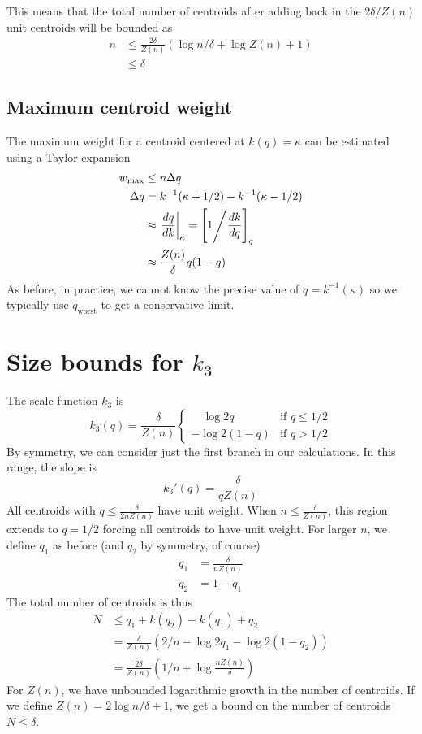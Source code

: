 \documentclass[11pt]{amsart}
\begin{document}
This means that the total number of centroids after adding back in the $2 \delta / Z(n)$ unit centroids will be bounded as
\[
\begin{aligned}
n&\le   \frac {2 \delta} {Z(n)} \left(  \log  n/ \delta + \log Z(n) + 1\right) \\
&\le  \delta
\end{aligned}
\]
\subsection{Maximum centroid weight}

The maximum weight for a centroid centered at $k(q) = \kappa$ can be estimated using a Taylor expansion
\[
\begin{aligned}
w_{\max} &\le n \Delta q \\
\Delta q &= k^{-1}(\kappa + 1/2) - k^{-1}(\kappa-1/2) \\
&\approx \left . \frac {dq} {dk} \right\rvert_{\kappa} = \left[ 1 \Bigg \slash {\frac {dk} {dq}} \right]_q\\
&\approx \frac {Z(n)} \delta q(1-q) \\
\end{aligned}
\]
As before, in practice, we cannot know the precise value of $q = k^{-1}(\kappa)$ so we typically use $q_{\text {worst}}$ to get a conservative limit.
\section{Size bounds for $k_3$}
The scale function $k_3$ is
\[
k_3(q) = \frac \delta {Z(n)}\begin{cases}
\quad \log 2q & \text{if  } q \le 1/2 \\
- \log 2(1-q) & \text{if  } q > 1/2
\end{cases}
\]
By symmetry, we can consider just the first branch in our calculations. In this range, the slope is
\[
k_3'(q) = \frac \delta { q Z(n)}  
\]
All centroids with $q \le \frac \delta {2 n Z(n)}$ have unit weight. When $n \le \frac \delta {Z(n)}$, this region extends to $q = 1/2$ forcing all centroids to have unit weight. For larger $n$, we define $q_1$ as before (and $q_2$ by symmetry, of course)
\[
\begin{aligned}
q_1 &= \frac \delta { n Z(n)} \\
q_2 &= 1-q_1
\end{aligned}
\]
The total number of centroids is thus
\[
\begin{aligned}
N &\le q_1 + k(q_2) - k(q_1) + q_2 \\
&= \frac \delta { Z(n)} \left(2/n -\log 2 q_1 - \log 2(1-q_2)\right)\\
&= \frac {2\delta} { Z(n)} \left(1/n + \log  \frac  { n Z(n)}\delta\right)
\end{aligned}
\]
For $Z(n)$, we have unbounded logarithmic growth in the number of centroids. If we define $Z(n) = 2\log n/\delta + 1$, we get a bound on the number of centroids $N \le \delta$.
\end{document}
